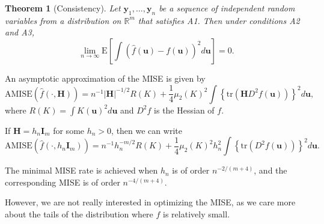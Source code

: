 \documentclass[11pt]{article}
\newcommand{\R}{\mathbb{R}}
\newtheorem{theorem}{Theorem}
\begin{document}
\begin{theorem}[Consistency] Let $\bm{y}_1,\dots,\bm{y}_n$ be a sequence of independent random variables from a distribution on $\R^m$ that satisfies A1. Then under conditions A2 and A3,
$$
\lim_{n\rightarrow\infty} \text{E}\left[\int \left(\hat{f}(\bm{u}) - f(\bm{u})\right)^2 d\bm{u}\right] = 0.
$$
\end{theorem}

An asymptotic approximation of the MISE is given by
\begin{equation}\label{eq:amse}
\text{AMISE}(\hat{f}(\cdot, \bm{H})) = n^{-1}|\bm{H}|^{-1/2} R(K) + \frac{1}{4} \mu_2(K)^2 \int \left\{\text{tr}(\bm{H} D^2 f(\bm{u}))\right\}^2 d\bm{u},
\end{equation}
where $R(K) = \int K(\bm{u})^2 d\bm{u}$ and $D^2 f$ is the Hessian of $f$.

If $\bm{H} = h_n \bm{I}_m$ for some $h_n > 0$, then we can write
\begin{equation}\label{eq:amse_iso}
\text{AMISE}(\hat{f}(\cdot, h_n \bm{I}_m)) = n^{-1} h_n^{-m/2} R(K) + \frac{1}{4} \mu_2(K)^2 h_n^2 \int \left\{\text{tr}(D^2 f(\bm{u}))\right\}^2 d\bm{u}.
\end{equation}

The minimal MISE rate is achieved when $h_n$ is of order $n^{-2/(m+4)}$, and the corresponding MISE is of order $n^{-4/(m+4)}$.

However, we are not really interested in optimizing the MISE, as we care more about the tails of the distribution where $f$ is relatively small.



\end{document}
